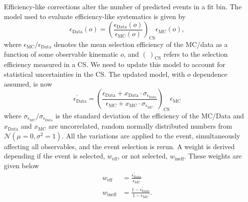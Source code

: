 Efficiency-like corrections alter the number of predicted events in
a fit bin. The model used to evaluate efficiency-like systematics
is given by
\begin{equation}
\epsilon_{\text{Data}}(o)=\left(\frac{\epsilon_{\text{Data}}(o)}{\epsilon_{\text{MC}}(o)}\right)_{\text{CS}}\epsilon_{\text{MC}}(o),\label{eq:effdatafromCS}
\end{equation}
where $\epsilon_{\text{MC}}/\epsilon_{\text{Data}}$ denotes the mean
selection efficiency of the MC/data as a function of some observable
kinematic $o$, and $\left(\ \right)_{\text{CS}}$ refers to the selection
efficiency measured in a CS. We need to update this model to account
for statistical uncertainties in the CS. The updated model, with $o$
dependence assumed, is now 
\begin{equation}
\epsilon_{\text{Data}}^{\prime}=\left(\frac{\epsilon_{\text{Data}}+x_{\text{Data}}\cdot\sigma_{\epsilon_{\text{Data}}}}{\epsilon_{\text{MC}}+x_{\text{MC}}\cdot\sigma_{\epsilon_{\text{MC}}}}\right)_{\text{CS}}\epsilon_{\text{MC}}\label{eq:effdataWithErrfromCS}
\end{equation}
where $\sigma_{\epsilon_{\text{MC}}}/\sigma_{\epsilon_{\text{Data}}}$
is the standard deviation of the efficiency of the MC/Data and $x_{\text{Data}}$
and $x_{\text{MC}}$ are uncorrelated, random normally distributed
numbers from $\mathcal{N}\left(\mu=0,\sigma^{2}=1\right)$. All the
variations are applied to the event, simultaneously affecting all
observables, and the event selection is rerun. A weight is derived
depending if the event is selected, $w_{\text{eff}}$, or not selected,
$w_{\text{ineff}}$. These weights are given below
\begin{equation}
\begin{aligned}w_{\text{eff}} & =\frac{\epsilon_{\text{Data}}^{\prime}}{\epsilon_{\text{MC}}}\\
w_{\text{ineff}} & =\frac{1-\epsilon_{\text{Data}}^{\prime}}{1-\epsilon_{\text{MC}}}.
\end{aligned}
\label{eq:weighteff}
\end{equation}

